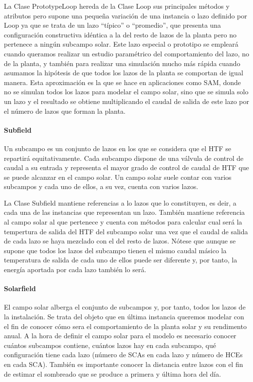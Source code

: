 La Clase PrototypeLoop hereda de la Clase Loop sus principales métodos y
atributos pero supone una pequeña variación de una instancia o lazo
definido por Loop ya que se trata de un lazo ``típico'' o ``promedio'',
que presenta una configuración constructiva idéntica a la del resto de
lazos de la planta pero no pertenece a ningún subcampo solar. Este lazo
especial o prototipo se empleará cuando queramos realizar un estudio
paramétrico del comportamiento del lazo, no de la planta, y también para
realizar una simulación mucho más rápida cuando asumamos la hipótesis de
que todos los lazos de la planta se comportan de igual manera. Esta
aproximación es la que se hace en aplicaciones como SAM, donde no se
simulan todos los lazos para modelar el campo solar, sino que se simula
solo un lazo y el resultado se obtiene multiplicando el caudal de salida
de este lazo por el número de lazos que forman la planta.

\hypertarget{subfield}{%
\paragraph{Subfield}\label{subfield}}

Un subcampo es un conjunto de lazos en los que se considera que el HTF
se repartirá equitativamente. Cada subcampo dispone de una válvula de
control de caudal a su entrada y representa el mayor grado de control de
caudal de HTF que se puede alcanzar en el campo solar. Un campo solar
suele contar con varios subcampos y cada uno de ellos, a su vez, cuenta
con varios lazos.

La Clase Subfield mantiene referencias a lo lazos que lo constituyen, es
deir, a cada una de las instancias que representan un lazo. También
mantiene referencia al campo solar al que pertenece y cuenta con métodos
para calcular cual será la tempertura de salida del HTF del subcampo
solar una vez que el caudal de salida de cada lazo se haya mezclado con
el del resto de lazos. Nótese que aunque se supone que todos los lazos
del subcampo tienen el mismo caudal másico la temperatura de salida de
cada uno de ellos puede ser diferente y, por tanto, la energía aportada
por cada lazo también lo será.

\hypertarget{solarfield}{%
\paragraph{Solarfield}\label{solarfield}}

El campo solar alberga el conjunto de subcampos y, por tanto, todos los
lazos de la instalación. Se trata del objeto que en última instancia
queremos modelar con el fin de conocer cómo sera el comportamiento de la
planta solar y su rendimento anual. A la hora de definir el campo solar
para el modelo es necesario conocer cuántos subcampos contiene, cuántos
lazos hay en cada subcampo, qué configuración tiene cada lazo (número de
SCAs en cada lazo y número de HCEs en cada SCA). También es importante
conocer la distancia entre lazos con el fin de estimar el sombreado que
se produce a primera y última hora del día.

